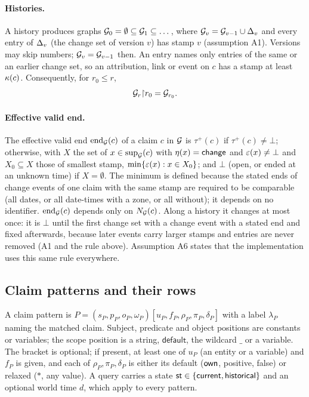 \paragraph{Histories.}
A history produces graphs $\mathcal G_0=\emptyset\subseteq\mathcal G_1\subseteq\dots$, where $\mathcal G_v=\mathcal G_{v-1}\cup
\Delta_v$ and every entry of $\Delta_v$ (the change set of version $v$) has stamp $v$ (assumption
A1). Versions may skip numbers; $\mathcal G_v=\mathcal G_{v-1}$ then. An entry names only entries of the same or
an earlier change set, so an attribution, link or event on $c$ has a stamp at least $\kappa(c)$.
Consequently, for $r_0\le r$,
\begin{equation}\label{eq:truncate}
\mathcal G_r{\restriction}r_0=\mathcal G_{r_0}.
\end{equation}

\paragraph{Effective valid end.}
The effective valid end $\mathrm{end}_\mathcal G(c)$ of a claim $c$ in $\mathcal G$ is $\tau^+(c)$ if
$\tau^+(c)\neq\bot$; otherwise, with $X$ the set of $x\in\mathrm{sup}_\mathcal G(c)$ with $\eta(x)=\textsf{change}$
and $\varepsilon(x)\neq\bot$ and $X_0\subseteq X$ those of smallest stamp, $\min\{\varepsilon(x):x\in X_0\}$;
and $\bot$ (open, or ended at an unknown time) if $X=\emptyset$. The minimum is defined because
the stated ends of change events of one claim with the same stamp are required to be comparable
(all dates, or all date-times with a zone, or all without); it depends on no identifier.
$\mathrm{end}_\mathcal G(c)$ depends only on $N_\mathcal G(c)$. Along a history it changes at most once: it is
$\bot$ until the first change set with a change event with a stated end and fixed afterwards,
because later events carry larger stamps and entries are never removed (A1 and the rule above).
Assumption A6 states that the implementation uses this same rule everywhere.

\subsection{Claim patterns and their rows}

A claim pattern is $P=(s_P,p_P,o_P,\omega_P)[u_P,f_P,\rho_P,\pi_P,\delta_P]$ with a label
$\lambda_P$ naming the matched claim. Subject, predicate and object positions are constants or
variables; the scope position is a string, $\mathsf{default}$, the wildcard $\_$ or a variable.
The bracket is optional; if present, at least one of $u_P$ (an entity or a variable) and $f_P$ is
given, and each of $\rho_P,\pi_P,\delta_P$ is either its default ($\textsf{own}$, positive, false) or
relaxed ($\ast$, any value). A query carries a state $\textsf{st}\in\{\textsf{current},\textsf{historical}\}$ and an
optional world time $d$, which apply to every pattern.

